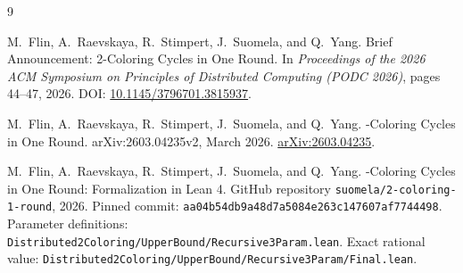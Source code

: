 \documentclass[11pt]{article}
\newcommand{\1}{\mathbf{1}}
\begin{document}
\begin{thebibliography}{9}

M.~Flin, A.~Raevskaya, R.~Stimpert, J.~Suomela, and Q.~Yang.
\newblock Brief Announcement: 2-Coloring Cycles in One Round.
\newblock In \emph{Proceedings of the 2026 ACM Symposium on Principles of
Distributed Computing (PODC 2026)}, pages 44--47, 2026.
\newblock DOI: \href{https://doi.org/10.1145/3796701.3815937}{10.1145/3796701.3815937}.

M.~Flin, A.~Raevskaya, R.~Stimpert, J.~Suomela, and Q.~Yang.
-Coloring Cycles in One Round.
\newblock arXiv:2603.04235v2, March 2026.
\newblock \href{https://arxiv.org/abs/2603.04235}{arXiv:2603.04235}.

M.~Flin, A.~Raevskaya, R.~Stimpert, J.~Suomela, and Q.~Yang.
-Coloring Cycles in One Round: Formalization in Lean 4.
\newblock GitHub repository \texttt{suomela/2-coloring-1-round}, 2026.
\newblock Pinned commit: \texttt{aa04b54db9a48d7a5084e263c147607af7744498}.
\newblock Parameter definitions:
\texttt{Distributed2Coloring/UpperBound/Recursive3Param.lean}.
\newblock Exact rational value:
\texttt{Distributed2Coloring/UpperBound/Recursive3Param/Final.lean}.

\end{thebibliography}
\end{document}
